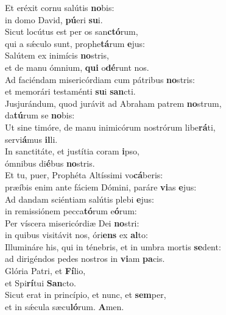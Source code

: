 \evenverse Et eréxit cornu salútis \textbf{no}bis:~\*\\
\evenverse in domo David, \textbf{pú}eri \textbf{su}i.\\
\oddverse Sicut locútus est per os san\textbf{ctó}rum,~\*\\
\oddverse qui a sǽculo sunt, prophe\textbf{tá}rum \textbf{e}jus:\\
\evenverse Salútem ex inimícis \textbf{no}stris,~\*\\
\evenverse et de manu ómnium, \textbf{qui} o\textbf{dé}runt nos.\\
\oddverse Ad faciéndam misericórdiam cum pátribus \textbf{no}stris:~\*\\
\oddverse et memorári testaménti \textbf{su}i \textbf{san}cti.\\
\evenverse Jusjurándum, quod jurávit ad Abraham patrem \textbf{no}strum,~\*\\
\evenverse da\textbf{tú}rum se \textbf{no}bis:\\
\oddverse Ut sine timóre, de manu inimicórum nostrórum libe\textbf{rá}ti,~\*\\
\oddverse servi\textbf{á}mus \textbf{il}li.\\
\evenverse In sanctitáte, et justítia coram \textbf{i}pso,~\*\\
\evenverse ómnibus di\textbf{é}bus \textbf{no}stris.\\
\oddverse Et tu, puer, Prophéta Altíssimi vo\textbf{cá}beris:~\*\\
\oddverse præíbis enim ante fáciem Dómini, paráre \textbf{vi}as \textbf{e}jus:\\
\evenverse Ad dandam sciéntiam salútis plebi \textbf{e}jus:~\*\\
\evenverse in remissiónem pecca\textbf{tó}rum e\textbf{ó}rum:\\
\oddverse Per víscera misericórdiæ Dei \textbf{no}stri:~\*\\
\oddverse in quibus visitávit nos, óri\textbf{ens} ex \textbf{al}to:\\
\evenverse Illumináre his, qui in ténebris, et in umbra mortis \textbf{se}dent:~\*\\
\evenverse ad dirigéndos pedes nostros in \textbf{vi}am \textbf{pa}cis.\\
\oddverse Glória Patri, et \textbf{Fí}lio,~\*\\
\oddverse et Spi\textbf{rí}tui \textbf{San}cto.\\
\evenverse Sicut erat in princípio, et nunc, et \textbf{sem}per,~\*\\
\evenverse et in sǽcula sæcu\textbf{ló}rum. \textbf{A}men.\\
